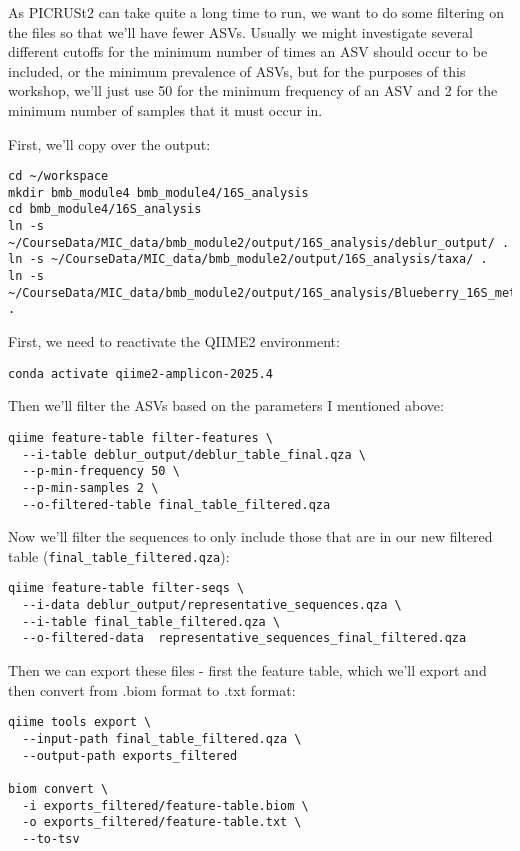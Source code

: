 \documentclass[
]{book}
\begin{document}
As PICRUSt2 can take quite a long time to run, we want to do some filtering on the files so that we'll have fewer ASVs. Usually we might investigate several different cutoffs for the minimum number of times an ASV should occur to be included, or the minimum prevalence of ASVs, but for the purposes of this workshop, we'll just use 50 for the minimum frequency of an ASV and 2 for the minimum number of samples that it must occur in.

First, we'll copy over the output:

\begin{verbatim}
cd ~/workspace
mkdir bmb_module4 bmb_module4/16S_analysis
cd bmb_module4/16S_analysis
ln -s ~/CourseData/MIC_data/bmb_module2/output/16S_analysis/deblur_output/ .
ln -s ~/CourseData/MIC_data/bmb_module2/output/16S_analysis/taxa/ .
ln -s ~/CourseData/MIC_data/bmb_module2/output/16S_analysis/Blueberry_16S_metadata.tsv .
\end{verbatim}

First, we need to reactivate the QIIME2 environment:

\begin{verbatim}
conda activate qiime2-amplicon-2025.4
\end{verbatim}

Then we'll filter the ASVs based on the parameters I mentioned above:

\begin{verbatim}
qiime feature-table filter-features \
  --i-table deblur_output/deblur_table_final.qza \
  --p-min-frequency 50 \
  --p-min-samples 2 \
  --o-filtered-table final_table_filtered.qza
\end{verbatim}

Now we'll filter the sequences to only include those that are in our new filtered table (\texttt{final\_table\_filtered.qza}):

\begin{verbatim}
qiime feature-table filter-seqs \
  --i-data deblur_output/representative_sequences.qza \
  --i-table final_table_filtered.qza \
  --o-filtered-data  representative_sequences_final_filtered.qza
\end{verbatim}

Then we can export these files - first the feature table, which we'll export and then convert from .biom format to .txt format:

\begin{verbatim}
qiime tools export \
  --input-path final_table_filtered.qza \
  --output-path exports_filtered
  
biom convert \
  -i exports_filtered/feature-table.biom \
  -o exports_filtered/feature-table.txt \
  --to-tsv 
\end{verbatim}
\end{document}
